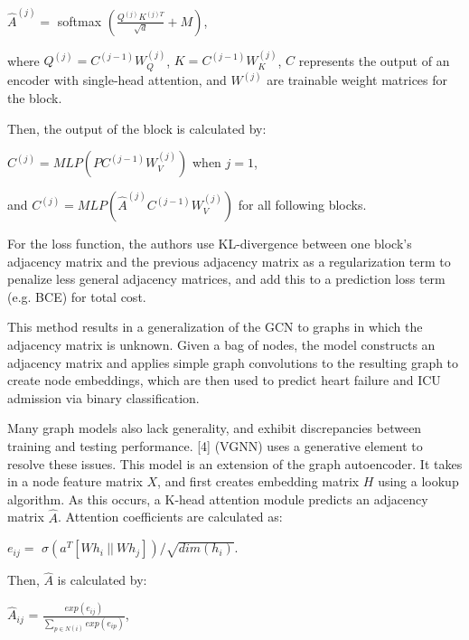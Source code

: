 \documentclass{article}
\begin{document}
\begin{center}
$\hat{A} ^{(j)}= $ softmax $(\frac{Q^{(j)}K^{(j)T}}{\sqrt{d}} + M)$,
\end{center}

where $Q^{(j)} = C^{(j-1)}W^{(j)}_Q$, $K = C^{(j-1)}W^{(j)}_K$, $C$ represents the output of an encoder with single-head attention, and $W^{(j)}$ are trainable weight matrices for the block.

Then, the output of the block is calculated by:

\begin{center}
$C^{(j)} = MLP(PC^{(j-1)}W_V^{(j)})$ when $j = 1$,

and $C^{(j)} = MLP(\hat{A}^{(j)} C^{(j-1)}W_V^{(j)})$ for all following blocks.

\end{center}

For the loss function, the authors use KL-divergence between one block's adjacency matrix and the previous adjacency matrix as a regularization term to penalize less general adjacency matrices, and add this to a prediction loss term (e.g. BCE) for total cost. 

This method results in a generalization of the GCN to graphs in which the adjacency matrix is unknown. Given a bag of nodes, the model constructs an adjacency matrix and applies simple graph convolutions to the resulting graph to create node embeddings, which are then used to predict heart failure and ICU admission via binary classification. 

Many graph models also lack generality, and exhibit discrepancies between training and testing performance. 
[4] (VGNN) uses a generative element to resolve these issues. This model is an extension of the graph autoencoder. It takes in a node feature matrix $X$, and first creates embedding matrix $H$ using a lookup algorithm. As this occurs, a K-head attention module predicts an adjacency matrix $\widehat{A}$. Attention coefficients are calculated as: 

\begin{center}
$e_{ij} = $ $\sigma(a^T[Wh_i \ || \ Wh_j])/\sqrt{dim(h_i)}$.
\end{center}

Then, $\widehat{A}$ is calculated by:

\begin{center}
$\widehat{A}_{ij}$ = $\frac{exp(e_{ij})}{\sum\limits_{p \in N(i)} exp(e_{ip})}$,
\end{center}
\end{document}
